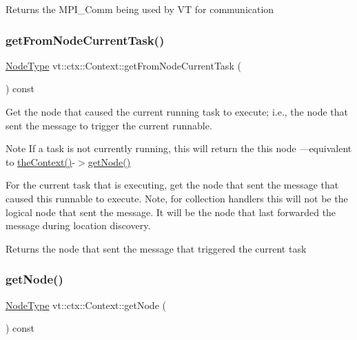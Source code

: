 \begin{DoxyReturn}{Returns}
the {\ttfamily M\+P\+I\+\_\+\+Comm} being used by VT for communication 
\end{DoxyReturn}
\mbox{\label{structvt_1_1ctx_1_1_context_abde7b4c10accf2b8c2bc68210a15590d}} 
\subsubsection{\texorpdfstring{get\+From\+Node\+Current\+Task()}{getFromNodeCurrentTask()}}
{\footnotesize\ttfamily \hyperlink{namespacevt_a866da9d0efc19c0a1ce79e9e492f47e2}{Node\+Type} vt\+::ctx\+::\+Context\+::get\+From\+Node\+Current\+Task (\begin{DoxyParamCaption}{ }\end{DoxyParamCaption}) const}



Get the node that caused the current running task to execute; i.\+e., the node that sent the message to trigger the current runnable. 

\begin{DoxyNote}{Note}
If a task is not currently running, this will return the this node ---equivalent to {\ttfamily \hyperlink{namespacevt_a26551fe0e6e6a1371111df5b12c7e92c}{the\+Context()}-\/$>$\hyperlink{structvt_1_1ctx_1_1_context_a0d52c263ce8516546a67443d9a86fa5f}{get\+Node()}} 
\end{DoxyNote}
For the current task that is executing, get the node that sent the message that caused this runnable to execute. Note, for collection handlers this will not be the logical node that sent the message. It will be the node that last forwarded the message during location discovery.

\begin{DoxyReturn}{Returns}
the node that sent the message that triggered the current task 
\end{DoxyReturn}
\mbox{\label{structvt_1_1ctx_1_1_context_a0d52c263ce8516546a67443d9a86fa5f}} 
\subsubsection{\texorpdfstring{get\+Node()}{getNode()}}
{\footnotesize\ttfamily \hyperlink{namespacevt_a866da9d0efc19c0a1ce79e9e492f47e2}{Node\+Type} vt\+::ctx\+::\+Context\+::get\+Node (\begin{DoxyParamCaption}{ }\end{DoxyParamCaption}) const\hspace{0.3cm}{\ttfamily [inline]}}



